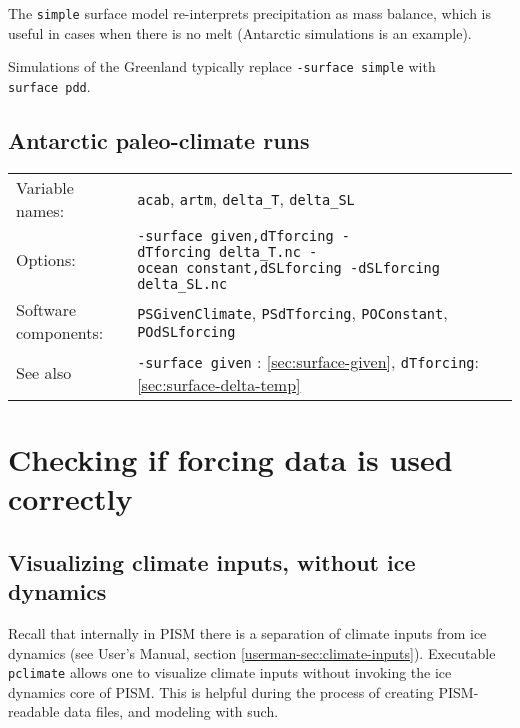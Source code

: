 \documentclass[titlepage,letterpaper,final]{scrartcl}
\begin{document}
The \texttt{simple} surface model re-interprets precipitation as mass balance, which is useful in cases when there is no melt (Antarctic simulations is an example).

Simulations of the Greenland typically replace \texttt{-surface~simple} with \texttt{surface~pdd}.

\subsection{Antarctic paleo-climate runs}
\label{sec:use-case-antarctica-paleo}

\begin{center}
  \begin{tabular}{lp{}}
    \toprule
    Variable names: & \texttt{acab}, \texttt{artm}, \texttt{delta_T}, \texttt{delta_SL}\\
    Options: & \texttt{-surface given,dTforcing \mbox{-dTforcing delta_T.nc}
      \mbox{-ocean constant,dSLforcing} -dSLforcing delta_SL.nc} \\
    Software   components:  &   \texttt{PSGivenClimate},  \texttt{PSdTforcing},
    \texttt{POConstant}, \texttt{POdSLforcing}\\
    See   also    &   \texttt{-surface~given}    :   \ref{sec:surface-given},
    \texttt{dTforcing}: \ref{sec:surface-delta-temp}\\
    \bottomrule
  \end{tabular}
\end{center}

\section{Checking if forcing data is used correctly}
\label{sec:checking-forcing}


\subsection{Visualizing climate inputs, without ice dynamics}
\label{sec:pclimate}

Recall that internally in PISM there is a separation of climate inputs from ice
dynamics (see User's Manual, section \ref*{userman-sec:climate-inputs}). Executable
\texttt{pclimate}  allows one to visualize climate inputs without
invoking the ice dynamics core of PISM. This is helpful during the process of
creating PISM-readable data files, and modeling with such.
\end{document}
